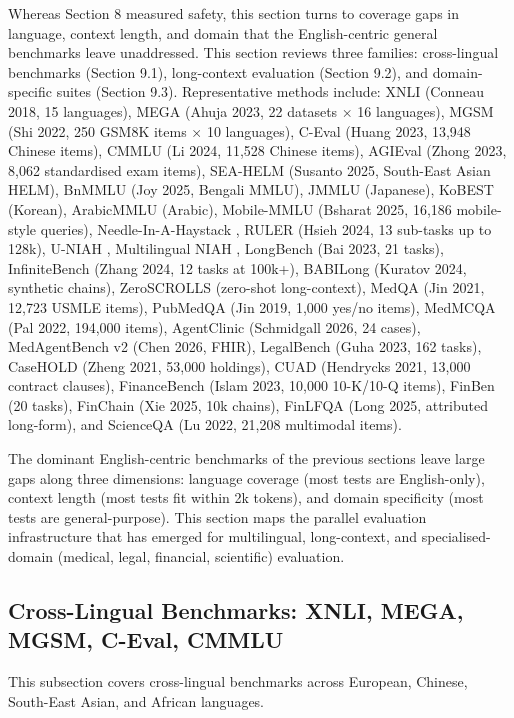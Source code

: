 \documentclass{article}
\begin{document}
Whereas Section 8 measured safety, this section turns to coverage gaps in language, context length, and domain that the English-centric general benchmarks leave unaddressed. This section reviews three families: cross-lingual benchmarks (Section 9.1), long-context evaluation (Section 9.2), and domain-specific suites (Section 9.3). Representative methods include: XNLI (Conneau 2018, 15 languages), MEGA (Ahuja 2023, 22 datasets × 16 languages), MGSM (Shi 2022, 250 GSM8K items × 10 languages), C-Eval (Huang 2023, 13,948 Chinese items), CMMLU (Li 2024, 11,528 Chinese items), AGIEval (Zhong 2023, 8,062 standardised exam items), SEA-HELM (Susanto 2025, South-East Asian HELM), BnMMLU (Joy 2025, Bengali MMLU), JMMLU (Japanese), KoBEST (Korean), ArabicMMLU (Arabic), Mobile-MMLU (Bsharat 2025, 16,186 mobile-style queries), Needle-In-A-Haystack \citep{kamradt2023needleinahaystackp}, RULER (Hsieh 2024, 13 sub-tasks up to 128k), U-NIAH \citep{gao20252025}, Multilingual NIAH \citep{hengle20242024}, LongBench (Bai 2023, 21 tasks), InfiniteBench (Zhang 2024, 12 tasks at 100k+), BABILong (Kuratov 2024, synthetic chains), ZeroSCROLLS (zero-shot long-context), MedQA (Jin 2021, 12,723 USMLE items), PubMedQA (Jin 2019, 1,000 yes/no items), MedMCQA (Pal 2022, 194,000 items), AgentClinic (Schmidgall 2026, 24 cases), MedAgentBench v2 (Chen 2026, FHIR), LegalBench (Guha 2023, 162 tasks), CaseHOLD (Zheng 2021, 53,000 holdings), CUAD (Hendrycks 2021, 13,000 contract clauses), FinanceBench (Islam 2023, 10,000 10-K/10-Q items), FinBen (20 tasks), FinChain (Xie 2025, 10k chains), FinLFQA (Long 2025, attributed long-form), and ScienceQA (Lu 2022, 21,208 multimodal items).

The dominant English-centric benchmarks of the previous sections leave large gaps along three dimensions: language coverage (most tests are English-only), context length (most tests fit within 2k tokens), and domain specificity (most tests are general-purpose). This section maps the parallel evaluation infrastructure that has emerged for multilingual, long-context, and specialised-domain (medical, legal, financial, scientific) evaluation.

\subsection{Cross-Lingual Benchmarks: XNLI, MEGA, MGSM, C-Eval, CMMLU}\label{cross-lingual-benchmarks-xnli-mega-mgsm-c-eval-cmmlu}

This subsection covers cross-lingual benchmarks across European, Chinese, South-East Asian, and African languages.
\end{document}
